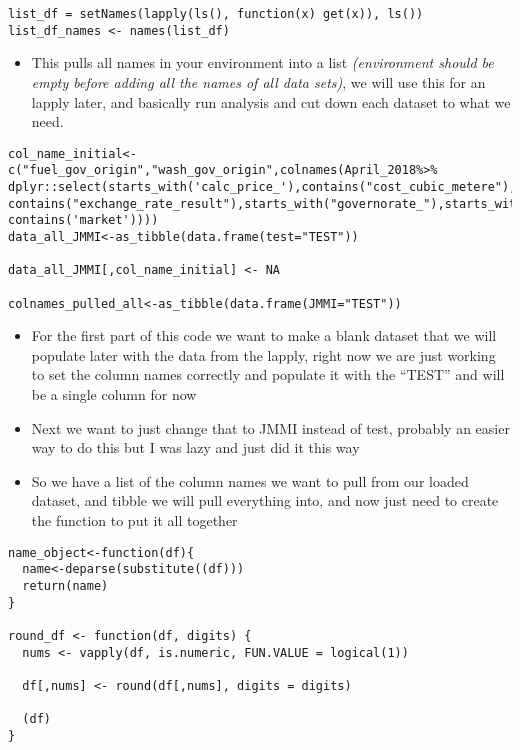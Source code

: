 \documentclass[
]{article}
\providecommand{\tightlist}{%
  \setlength{\itemsep}{0pt}\setlength{\parskip}{0pt}}
\begin{document}
\begin{verbatim}
list_df = setNames(lapply(ls(), function(x) get(x)), ls())
list_df_names <- names(list_df)
\end{verbatim}

\begin{itemize}
\tightlist
\item
  This pulls all names in your environment into a list
  \emph{(environment should be empty before adding all the names of all
  data sets)}, we will use this for an lapply later, and basically run
  analysis and cut down each dataset to what we need.
\end{itemize}

\begin{verbatim}
col_name_initial<-c("fuel_gov_origin","wash_gov_origin",colnames(April_2018%>% dplyr::select(starts_with('calc_price_'),contains("cost_cubic_metere"), contains("exchange_rate_result"),starts_with("governorate_"),starts_with("district_"),-contains('market'))))
data_all_JMMI<-as_tibble(data.frame(test="TEST"))

data_all_JMMI[,col_name_initial] <- NA

colnames_pulled_all<-as_tibble(data.frame(JMMI="TEST"))
\end{verbatim}

\begin{itemize}
\item
  For the first part of this code we want to make a blank dataset that
  we will populate later with the data from the lapply, right now we are
  just working to set the column names correctly and populate it with
  the ``TEST'' and will be a single column for now
\item
  Next we want to just change that to JMMI instead of test, probably an
  easier way to do this but I was lazy and just did it this way
\item
  So we have a list of the column names we want to pull from our loaded
  dataset, and tibble we will pull everything into, and now just need to
  create the function to put it all together
\end{itemize}

\begin{verbatim}
name_object<-function(df){
  name<-deparse(substitute((df)))
  return(name)
}

round_df <- function(df, digits) {
  nums <- vapply(df, is.numeric, FUN.VALUE = logical(1))
  
  df[,nums] <- round(df[,nums], digits = digits)
  
  (df)
}
\end{verbatim}
\end{document}
